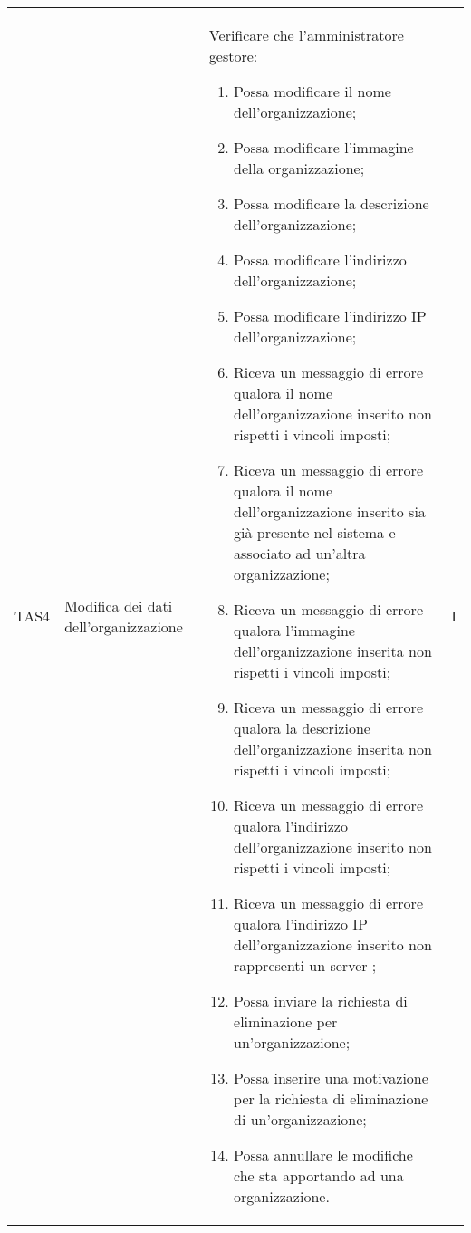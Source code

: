 {\begin{longtable}{ c  C{2.5cm}  C{10cm} C{1cm}}
TAS4 & Modifica dei dati dell'organizzazione &
Verificare che l'amministratore gestore:
\begin{enumerate}
    \item Possa modificare il nome dell'organizzazione;
    \item Possa modificare l'immagine della organizzazione;
    \item Possa modificare la descrizione dell’organizzazione;
    \item Possa modificare l'indirizzo dell’organizzazione;
    \item Possa modificare l'indirizzo IP dell'organizzazione;
    \item Riceva un messaggio di errore qualora il nome dell'organizzazione inserito non rispetti i vincoli imposti;
    \item Riceva un messaggio di errore qualora il nome dell'organizzazione inserito sia già presente nel sistema e associato ad un'altra organizzazione;
    \item Riceva un messaggio di errore qualora l'immagine dell'organizzazione inserita non rispetti i vincoli imposti;
    \item Riceva un messaggio di errore qualora la descrizione dell'organizzazione inserita non rispetti i vincoli imposti;
    \item Riceva un messaggio di errore qualora l'indirizzo dell'organizzazione inserito non rispetti i vincoli imposti;
    \item Riceva un messaggio di errore qualora l'indirizzo IP dell'organizzazione inserito non rappresenti un server ;
    \item Possa inviare la richiesta di eliminazione per un'organizzazione;
    \item Possa inserire una motivazione per la richiesta di eliminazione di un'organizzazione;
    \item Possa annullare le modifiche che sta apportando ad una organizzazione.
\end{enumerate} & I \\


\end{longtable}}

